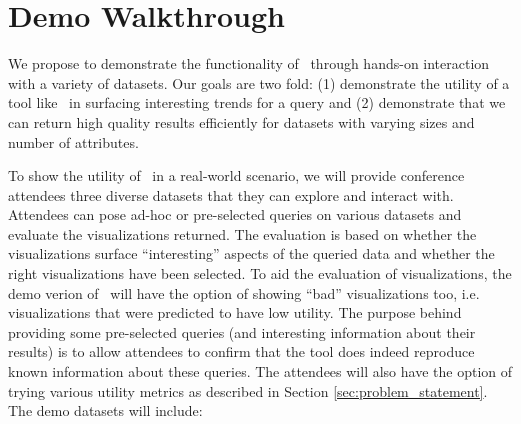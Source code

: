 
\section{Demo Walkthrough}
\label{demo-walkthrough}
 
We propose to demonstrate the functionality of \SeeDB\ through hands-on
interaction with a variety of datasets. Our goals are two fold: (1) demonstrate
the utility of a tool like \SeeDB\ in surfacing interesting trends for a query
and (2) demonstrate that we can return high quality results efficiently for
datasets with varying sizes and number of attributes.

 To show the utility of \SeeDB\ in a real-world
scenario, we will provide conference attendees three diverse datasets that they
can explore and interact with. Attendees can pose ad-hoc or pre-selected queries
on various datasets and evaluate the visualizations returned. The
evaluation is based on whether the visualizations surface ``interesting''
aspects of the queried data and whether the right visualizations have been
selected. To aid the evaluation of visualizations, the demo verion of \SeeDB\
will have the option of showing ``bad'' visualizations too, i.e. visualizations
that were predicted to have low utility. The purpose behind providing some
pre-selected queries (and interesting information about their results) is to
allow attendees to confirm that the tool does indeed reproduce known
information about these queries. The attendees will also have the option of
trying various utility metrics as described in Section
\ref{sec:problem_statement}. The demo datasets will include:
 
